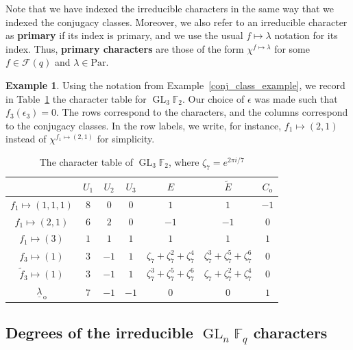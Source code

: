\documentclass[10pt]{article}
\theoremstyle{definition}
\newtheorem{example}[theorem]{Example}
\DeclareMathOperator{\GL}{GL}
\newcommand{\F}{\mathbb{F}}
\newcommand{\CF}{\mathcal{F}}
\newcommand{\eps}{\epsilon}
\newcommand{\myemph}{\textbf}
\newcommand{\Par}{\text{Par}}
\newcommand{\ulambda}{{\underline{\lambda}}}
\begin{document}
Note that we have indexed the irreducible characters in the same way that we indexed the conjugacy classes.
Moreover, we also refer to an irreducible character as \myemph{primary} if its index is primary, and we use the usual \(f \mapsto \lambda\) notation for its index.
Thus, \myemph{primary characters} are those of the form \(\chi^{f \mapsto \lambda}\) for some \(f \in \CF (q)\) and \(\lambda \in \Par\).

\begin{example}
\label{runningexample}
Using the notation from Example~\ref{conj_class_example}, we record in Table~\ref{GL3F2_char_table} the character table for $\GL_3 \F_2$.
Our choice of \(\eps\) was made such that \(f_3(\eps_3) = 0\).
The rows correspond to the characters, and the columns correspond to the conjugacy classes.
In the row labels, we write, for instance, $f_1 \mapsto (2,1)$ instead of $\chi^{f_1 \mapsto (2,1)}$ for simplicity.

\begin{table}[ht]
\caption{The character table of \(\GL_3 \F_2\), where $\zeta_7 = e^{2 \pi i / 7}$}
\centering
\begin{tabular}{ c || c | c | c | c | c | c }
 & $U_1$ & $U_2$ & $U_3$ & $E$ & $\tilde{E}$ & $C_{\mathrm{o}}$ \\ \hline \hline
$f_1 \mapsto (1,1,1)$ & $8$ & $0$ & $0$ & $1$ & $1$ & $-1$  \\
$f_1 \mapsto (2,1)$ & $6$ & $2$ & $0$ & $-1$ & $-1$ & $0$ \\
$f_1 \mapsto (3)$ & $1$ & $1$ & $1$ & $1$ & $1$ & $1$ \\
$f_3 \mapsto (1)$ & $3$ & $-1$ & $1$ & $\zeta_7 + \zeta_7^2 + \zeta_7^4$ & $\zeta_7^3 + \zeta_7^5 + \zeta_7^6$ & $0$  \\
$\tilde{f}_3 \mapsto (1)$ & $3$ & $-1$ & $1$ & $\zeta_7^3 + \zeta_7^5 + \zeta_7^6$ & $\zeta_7 + \zeta_7^2 + \zeta_7^4$ & $0$  \\
$\ulambda_{\,\mathrm{o}}$ & $7$ & $-1$ & $-1$ & $0$ & $0$ & $1$  \\
\end{tabular}
\label{GL3F2_char_table}
\end{table}
\end{example}









\subsection{Degrees of the irreducible \texorpdfstring{$\GL_n \F_q$}{GLn Fq} characters}
\end{document}
